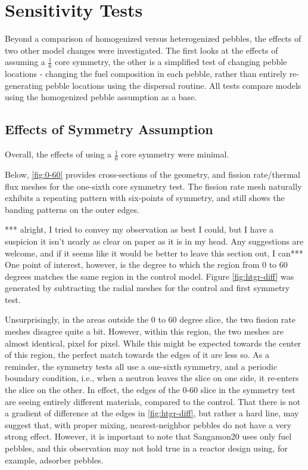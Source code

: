 \section{Sensitivity Tests}
Beyond a comparison of homogenized versus heterogenized pebbles, the effects of two other model changes were investigated.  The first looks at the effects of assuming a $\frac{1}{6}$ core symmetry, the other is a simplified test of changing pebble locations - changing the fuel composition in each pebble, rather than entirely re-generating pebble locations using the dispersal routine.  All tests compare models using the homogenized pebble assumption as a base.

\subsection{Effects of Symmetry Assumption}

Overall, the effects of using a $\frac{1}{6}$ core symmetry were minimal.




Below, \ref{fig:0-60} provides cross-sections of the geometry, and fission rate/thermal flux meshes for the one-sixth core symmetry test.  The fission rate mesh naturally exhibits a repeating pattern with six-points of symmetry, and still shows the banding patterns on the outer edges. 



*** alright, I tried to convey my observation as best I could, but I have a suspicion it isn't nearly as clear on paper as it is in my head.  Any suggestions are welcome, and if it seems like it would be better to leave this section out, I can***
One point of interest, however, is the degree to which the region from 0 to 60 degrees matches the same region in the control model.  Figure \ref{fig:htgr-diff} was generated by subtracting the radial meshes for the control and first symmetry test.



Unsurprisingly, in the areas outside the 0 to 60 degree slice, the two fission rate meshes disagree quite a bit.  However, within this region, the two meshes are almost identical, pixel for pixel.  While this might be expected towards the center of this region, the perfect match towards the edges of it are less so.  As a reminder, the symmetry tests all use a one-sixth symmetry, and a periodic boundary condition, i.e., when a neutron leaves the slice on one side, it re-enters the slice on the other.  In effect, the edges of the 0-60 slice in the symmetry test are seeing entirely different materials, compared to the control.  That there is not a gradient of difference at the edges in \ref{fig:htgr-diff}, but rather a hard line, may suggest that, with proper mixing, nearest-neighbor pebbles do not have a very strong effect.  However, it is important to note that Sangamon20 uses only fuel pebbles, and this observation may not hold true in a reactor design using, for example, adsorber pebbles. 



